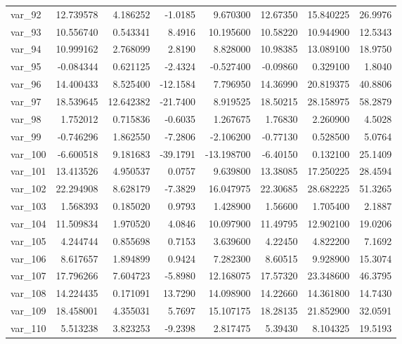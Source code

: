 \documentclass[12pt]{article}
\begin{document}
\begin{longtable}{lrrrrrrr}
  var\_92 &  12.739578 &   4.186252 &  -1.0185 &   9.670300 &  12.67350 &  15.840225 &  26.9976 \\
  var\_93 &  10.556740 &   0.543341 &   8.4916 &  10.195600 &  10.58220 &  10.944900 &  12.5343 \\
  var\_94 &  10.999162 &   2.768099 &   2.8190 &   8.828000 &  10.98385 &  13.089100 &  18.9750 \\
  var\_95 &  -0.084344 &   0.621125 &  -2.4324 &  -0.527400 &  -0.09860 &   0.329100 &   1.8040 \\
  var\_96 &  14.400433 &   8.525400 & -12.1584 &   7.796950 &  14.36990 &  20.819375 &  40.8806 \\
  var\_97 &  18.539645 &  12.642382 & -21.7400 &   8.919525 &  18.50215 &  28.158975 &  58.2879 \\
  var\_98 &   1.752012 &   0.715836 &  -0.6035 &   1.267675 &   1.76830 &   2.260900 &   4.5028 \\
  var\_99 &  -0.746296 &   1.862550 &  -7.2806 &  -2.106200 &  -0.77130 &   0.528500 &   5.0764 \\
 var\_100 &  -6.600518 &   9.181683 & -39.1791 & -13.198700 &  -6.40150 &   0.132100 &  25.1409 \\
 var\_101 &  13.413526 &   4.950537 &   0.0757 &   9.639800 &  13.38085 &  17.250225 &  28.4594 \\
 var\_102 &  22.294908 &   8.628179 &  -7.3829 &  16.047975 &  22.30685 &  28.682225 &  51.3265 \\
 var\_103 &   1.568393 &   0.185020 &   0.9793 &   1.428900 &   1.56600 &   1.705400 &   2.1887 \\
 var\_104 &  11.509834 &   1.970520 &   4.0846 &  10.097900 &  11.49795 &  12.902100 &  19.0206 \\
 var\_105 &   4.244744 &   0.855698 &   0.7153 &   3.639600 &   4.22450 &   4.822200 &   7.1692 \\
 var\_106 &   8.617657 &   1.894899 &   0.9424 &   7.282300 &   8.60515 &   9.928900 &  15.3074 \\
 var\_107 &  17.796266 &   7.604723 &  -5.8980 &  12.168075 &  17.57320 &  23.348600 &  46.3795 \\
 var\_108 &  14.224435 &   0.171091 &  13.7290 &  14.098900 &  14.22660 &  14.361800 &  14.7430 \\
 var\_109 &  18.458001 &   4.355031 &   5.7697 &  15.107175 &  18.28135 &  21.852900 &  32.0591 \\
 var\_110 &   5.513238 &   3.823253 &  -9.2398 &   2.817475 &   5.39430 &   8.104325 &  19.5193 \\

\end{longtable}
\end{document}
